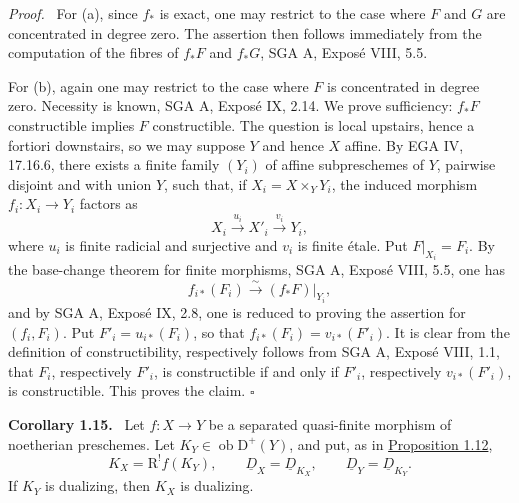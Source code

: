 \documentclass[11pt]{article}
\providecommand{\qedtext}{\hfill$\square$}
\newenvironment{statement}[1]{\par\medskip\noindent\textbf{#1.}\ }{\par\medskip}
\newenvironment{prooftext}[1][Proof]{\par\noindent\emph{#1.}\ }{\par\medskip}
\newcommand{\R}{\mathrm{R}}
\newcommand{\D}{\mathrm{D}}
\newcommand{\ob}{\operatorname{ob}}
\providecommand{\ob}{\operatorname{ob}}
\providecommand{\R}{\mathrm R}
\providecommand{\qedtext}{\hfill$\square$}
\begin{document}
\begin{prooftext}
For (a), since $f_*$ is exact, one may restrict to the case where $F$ and $G$ are concentrated in degree zero. The assertion then follows immediately from the computation of the fibres of $f_*F$ and $f_*G$, SGA A, Exposé VIII, 5.5.

For (b), again one may restrict to the case where $F$ is concentrated in degree zero. Necessity is known, SGA A, Exposé IX, 2.14. We prove sufficiency: $f_*F$ constructible implies $F$ constructible. The question is local upstairs, hence a fortiori downstairs, so we may suppose $Y$ and hence $X$ affine. By EGA IV, 17.16.6, there exists a finite family $(Y_i)$ of affine subpreschemes of $Y$, pairwise disjoint and with union $Y$, such that, if $X_i=X\times_YY_i$, the induced morphism $f_i:X_i\to Y_i$ factors as
\[
   X_i\xrightarrow{u_i}X'_i\xrightarrow{v_i}Y_i,
\]
where $u_i$ is finite radicial and surjective and $v_i$ is finite étale. Put $F|_{X_i}=F_i$. By the base-change theorem for finite morphisms, SGA A, Exposé VIII, 5.5, one has
\[
   f_{i*}(F_i)\xrightarrow{\sim}(f_*F)|_{Y_i},
\]
and by SGA A, Exposé IX, 2.8, one is reduced to proving the assertion for $(f_i,F_i)$. Put $F'_i=u_{i*}(F_i)$, so that $f_{i*}(F_i)=v_{i*}(F'_i)$. It is clear from the definition of constructibility, respectively follows from SGA A, Exposé VIII, 1.1, that $F_i$, respectively $F'_i$, is constructible if and only if $F'_i$, respectively $v_{i*}(F'_i)$, is constructible. This proves the claim. \qedtext
\end{prooftext}

\label{sga5:I:corollary:1.15}\begin{statement}{Corollary 1.15}
Let $f:X\to Y$ be a separated quasi-finite morphism of noetherian preschemes. Let $K_Y\in\ob\D^+(Y)$, and put, as in \hyperref[sga5:I:proposition:1.12]{Proposition 1.12},
\[
   K_X=\R^!f(K_Y),\qquad \underline D_X=\underline D_{K_X},\qquad \underline D_Y=\underline D_{K_Y}.
\]
If $K_Y$ is dualizing, then $K_X$ is dualizing.
\end{statement}
\end{document}
